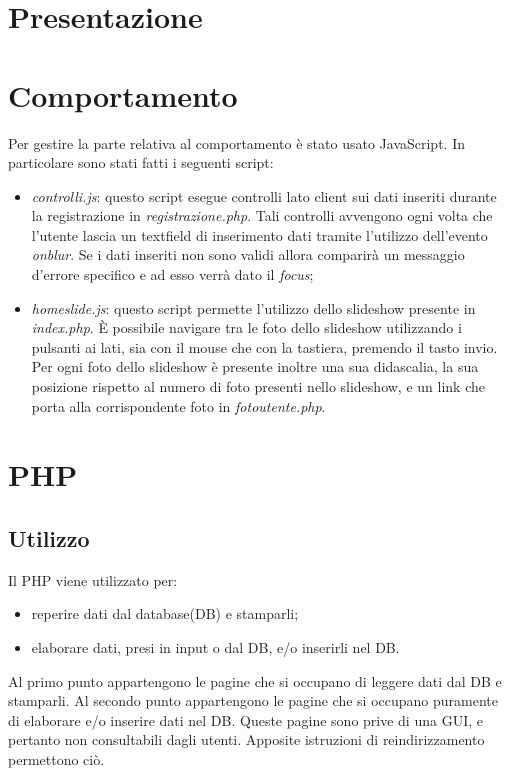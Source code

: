 	\section{Presentazione}	
	\section{Comportamento}
	Per gestire la parte relativa al comportamento è stato usato JavaScript. In particolare sono stati fatti i seguenti script:
	\begin{itemize}
	\item \textit{controlli.js}: questo script esegue controlli lato client sui dati inseriti durante la registrazione in \textit{registrazione.php}. Tali controlli avvengono ogni volta che l'utente lascia un textfield di inserimento dati tramite l'utilizzo dell'evento \textit{onblur}. Se i dati inseriti non sono validi allora comparirà un messaggio d'errore specifico e ad esso verrà dato il \textit{focus};
	\item \textit{homeslide.js}: questo script permette l'utilizzo dello slideshow presente in \textit{index.php}. È possibile navigare tra le foto dello slideshow utilizzando i pulsanti ai lati, sia con il mouse che con la tastiera, premendo il tasto invio. Per ogni foto dello slideshow è presente inoltre una sua didascalia, la sua posizione rispetto al numero di foto presenti nello slideshow, e un link che porta alla corrispondente foto in \textit{fotoutente.php}. 
	\end{itemize}
	\newpage
	\section{PHP}
	\subsection{Utilizzo}
	Il PHP viene utilizzato per:
	\begin{itemize}
	\item reperire dati dal database(DB) e stamparli;
	\item elaborare dati, presi in input o dal DB, e/o inserirli nel DB.
	\end{itemize} 
	
	Al primo punto appartengono le pagine che si occupano di leggere dati dal DB e stamparli.
	Al secondo punto appartengono le pagine che si occupano puramente di elaborare e/o inserire dati nel DB. Queste pagine sono prive di una GUI, e pertanto non consultabili dagli utenti. Apposite istruzioni di reindirizzamento permettono ciò.
	
